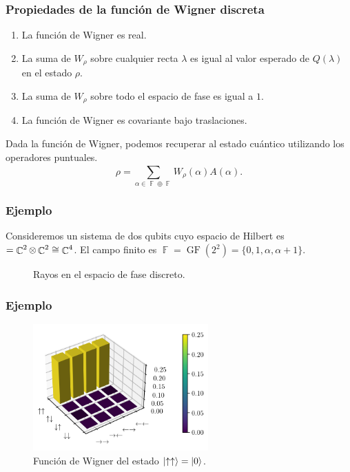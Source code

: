\documentclass[10pt]{beamer}
\DeclareMathOperator{\C}{\mathbb{C}}
\DeclareMathOperator{\F}{\mathbb{F}}
\let\H\relax
\DeclareMathOperator{\H}{\mathcal H}
\DeclareMathOperator{\GF}{GF}
\begin{document}
  \begin{frame}
    \frametitle{Propiedades de la función de Wigner
    discreta}

    \begin{enumerate}
      \item La función de Wigner es real.
      \item La suma de $W_\rho$ sobre cualquier recta
        $\lambda$ es igual al valor esperado de $Q(\lambda)$
        en el estado $\rho$.
      \item La suma de $W_\rho$ sobre todo el espacio de
        fase es igual a $1$.
      \item La función de Wigner es covariante bajo
        traslaciones.
    \end{enumerate}

    \vspace{10pt}

    Dada la función de Wigner, podemos recuperar al estado
    cuántico utilizando los operadores puntuales.
    \begin{equation}
      \rho
      = \sum_{\alpha \in \F \oplus \F}^{}
      W_\rho(\alpha) A(\alpha).
    \end{equation}
  \end{frame}

  \begin{frame}
    \frametitle{Ejemplo}

    Consideremos un sistema de dos qubits cuyo espacio de
    Hilbert es $\H = \C^2 \otimes \C^2 \cong \C^{4}$. El
    campo finito es $\F = \GF(2^2) =
    \{0,1,\alpha,\alpha+1\}$.
    \begin{figure}[h]
      \centering
      \scalebox{0.5}{
        
      }
      \caption{Rayos en el espacio de fase discreto.}
      \label{fig:affine-desargues-2-2}
    \end{figure}
  \end{frame}

  \begin{frame}
    \frametitle{Ejemplo}

    \begin{figure}[h]
      \centering
      \includegraphics[width=0.6\textwidth]{
      imgs/wigner-desargues-2-2-s1.png}
      \caption{Función de Wigner del estado
      $\ket{\uparrow\uparrow} = \ket{0}$.}
      \label{fig:wigner-desargues-2-2-s1}
    \end{figure}
  \end{frame}
\end{document}
